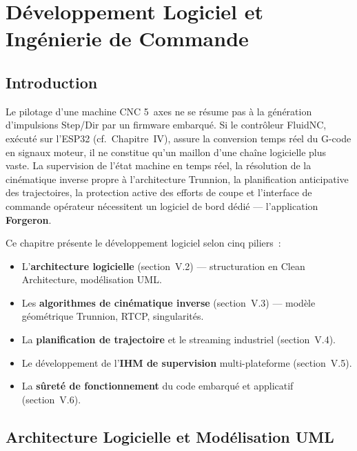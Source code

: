 \documentclass[12pt,a4paper]{report}
\begin{document}
\setcounter{chapter}{4}

\chapter{Développement Logiciel et Ingénierie de Commande}

\section{Introduction}

Le pilotage d'une machine CNC 5~axes ne se résume pas à la génération d'impulsions Step/Dir par un firmware embarqué. Si le contrôleur FluidNC, exécuté sur l'ESP32 (cf.~Chapitre~IV), assure la conversion temps réel du G-code en signaux moteur, il ne constitue qu'un maillon d'une chaîne logicielle plus vaste. La supervision de l'état machine en temps réel, la résolution de la cinématique inverse propre à l'architecture Trunnion, la planification anticipative des trajectoires, la protection active des efforts de coupe et l'interface de commande opérateur nécessitent un logiciel de bord dédié --- l'application \textbf{Forgeron}.

Ce chapitre présente le développement logiciel selon cinq piliers~:
\begin{itemize}
  \item L'\textbf{architecture logicielle} (section~V.2) --- structuration en Clean Architecture, modélisation UML.
  \item Les \textbf{algorithmes de cinématique inverse} (section~V.3) --- modèle géométrique Trunnion, RTCP, singularités.
  \item La \textbf{planification de trajectoire} et le streaming industriel (section~V.4).
  \item Le développement de l'\textbf{IHM de supervision} multi-plateforme (section~V.5).
  \item La \textbf{sûreté de fonctionnement} du code embarqué et applicatif (section~V.6).
\end{itemize}

\section{Architecture Logicielle et Modélisation UML}
\end{document}
